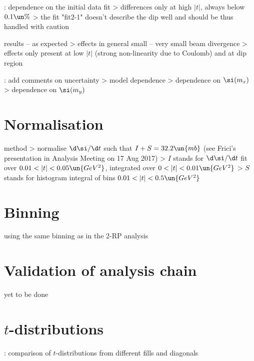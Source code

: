 \>  : dependence on the initial data fit
\>> differences only at high $|t|$, always below $0.1\un{\%}$
\>> the fit "fit2-1" doesn't describe the dip well and should be thus handled with caution

\> results -- as expected
\>> effects in general small -- very small beam divergence
\>> effects only present at low $|t|$ (strong non-linearity due to Coulomb) and at dip region

\> \TODO: add comments on uncertainty
\>> model dependence
\>> dependence on $\si(m_x)$
\>> dependence on $\si(m_y)$


\section{Normalisation}

\> method
\>> normalise $\d\si/\d t$ such that $I + S = 32.2\un{mb}$ (see Frici's presentation in Analysis Meeting on 17 Aug 2017)
\>> $I$ stands for $\d\si/\d t$ fit over $0.01 < |t| < 0.05\un{GeV^2}$, integrated over $0 < |t| < 0.01\un{GeV^2}$
\>> $S$ stands for histogram integral of bins $0.01 < |t| < 0.5\un{GeV^2}$


\section{Binning}

\> using the same binning as in the 2-RP analysis



\section{Validation of analysis chain}

\> yet to be done


\section{$t$-distributions}

\>  : comparison of $t$-distributions from different fills and diagonals

